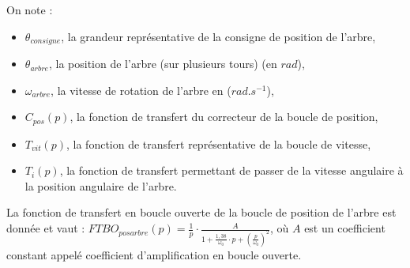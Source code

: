 On note :
\begin{itemize}
 \item $\theta_{consigne}$, la grandeur représentative de la consigne de position de l'arbre,
 \item $\theta_{arbre}$, la position de l'arbre (sur plusieurs tours) (en $rad$),
 \item $\omega_{arbre}$, la vitesse de rotation de l'arbre en ($rad.s^{-1}$),
 \item $C_{pos}(p)$, la fonction de transfert du correcteur de la boucle de position,
 \item $T_{vit}(p)$, la fonction de transfert représentative de la boucle de vitesse,
 \item $T_i(p)$, la fonction de transfert permettant de passer de la vitesse angulaire à la position angulaire de l'arbre.
\end{itemize}


La fonction de transfert en boucle ouverte de la boucle de position de l'arbre est donnée et vaut :
$FTBO_{posarbre}(p)=\frac{1}{p}\cdot \frac{A}{1+\frac{1,38}{\omega_0}\cdot p+\left(\frac{p}{\omega_0}\right)^2}$, où $A$ est un coefficient constant appelé coefficient d'amplification en boucle ouverte.



